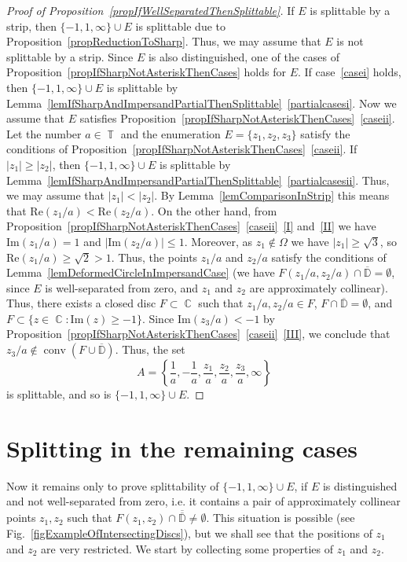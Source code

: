 \documentclass{amsart}
\numberwithin{equation}{section}
\theoremstyle{definition}
\theoremstyle{remark}
\DeclareMathOperator{\conv}{conv}
\DeclareMathOperator{\CC}{\mathbb C}
\DeclareMathOperator{\TT}{\mathbb T}
\begin{document}
	\begin{proof}[Proof of Proposition~\ref{propIfWellSeparatedThenSplittable}]
		If $E$ is splittable by a strip, then $\{-1, 1, \infty\} \cup E$ is splittable due to Proposition~\ref{propReductionToSharp}. Thus, we may assume that $E$ is not splittable by a strip. Since $E$ is also distinguished, one of the cases of Proposition~\ref{propIfSharpNotAsteriskThenCases} holds for $E$. If case~\ref{casei} holds, then $\{-1, 1, \infty\} \cup E$ is splittable by Lemma~\ref{lemIfSharpAndImpersandPartialThenSplittable}~\ref{partialcasesi}. Now we assume that $E$ satisfies Proposition~\ref{propIfSharpNotAsteriskThenCases}~\ref{caseii}. Let the number $a \in \TT$ and the enumeration $E = \{z_1, z_2, z_3\}$ satisfy the conditions of Proposition~\ref{propIfSharpNotAsteriskThenCases}~\ref{caseii}. If $|z_1| \ge |z_2|$, then $\{-1, 1, \infty\} \cup E$ is splittable by Lemma~\ref{lemIfSharpAndImpersandPartialThenSplittable}~\ref{partialcasesii}. Thus, we may assume that $|z_1| < |z_2|$. By Lemma~\ref{lemComparisonInStrip} this means that $\mathrm{Re}(z_1/a) < \mathrm{Re}(z_2/a)$. On the other hand, from Proposition~\ref{propIfSharpNotAsteriskThenCases}~\ref{caseii}~\ref{I} and~\ref{II} we have $\mathrm{Im}(z_1/a) = 1$ and $|\mathrm{Im}(z_2/a)| \le 1$. Moreover, as $z_1 \notin \Omega$ we have $|z_1| \ge \sqrt{3}$, so $\mathrm{Re}(z_1/a) \ge \sqrt{2} > 1$. Thus, the points $z_1/a$ and $z_2/a$ satisfy the conditions of Lemma~\ref{lemDeformedCircleInImpersandCase} (we have $F(z_1/a, z_2/a) \cap \overline{\mathbb D} = \emptyset$, since $E$ is well-separated from zero, and $z_1$ and $z_2$ are approximately collinear). Thus, there exists a closed disc $F \subset \CC$ such that $z_1/a, z_2/a \in F$, $F \cap \overline{\mathbb D} = \emptyset$, and $F  \subset \{z \in \CC: \mathrm{Im}(z) \ge -1\}$. Since $\mathrm{Im}(z_3/a) < -1$ by Proposition~\ref{propIfSharpNotAsteriskThenCases}~\ref{caseii}~\ref{III}, we conclude that $z_3/a \notin \conv(F \cup \overline{\mathbb D})$. Thus, the set 
		\[
		A = \left\{\dfrac{1}{a}, -\dfrac{1}{a}, \dfrac{z_1}{a}, \dfrac{z_2}{a}, \dfrac{z_3}{a}, \infty\right\}
		\]
		is splittable, and so is $\{-1, 1, \infty\} \cup E$.
	\end{proof}
	
	\section{Splitting in the remaining cases}\label{sec:Calculations}
	\FloatBarrier
	Now it remains only to prove splittability of $\{-1,1,\infty\} \cup E$, if $E$ is distinguished and not well-separated from zero, i.e. it contains a pair of approximately collinear points $z_1,z_2$ such that $F(z_1,z_2) \cap \overline{\mathbb \overline{D}} \ne \emptyset$. This situation is possible (see Fig.~\ref{figExampleOfIntersectingDiscs}), but we shall see that the positions of $z_1$ and $z_2$ are very restricted. We start by collecting some properties of $z_1$ and $z_2$.
	
\end{document}
